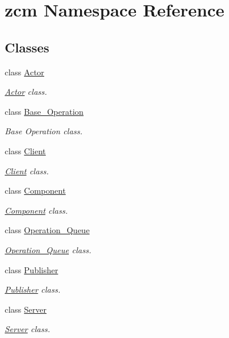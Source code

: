 \hypertarget{namespacezcm}{}\section{zcm Namespace Reference}
\label{namespacezcm}
\subsection*{Classes}
\begin{DoxyCompactItemize}
\item 
class \hyperlink{classzcm_1_1Actor}{Actor}
\begin{DoxyCompactList}\small\item\em \hyperlink{classzcm_1_1Actor}{Actor} class. \end{DoxyCompactList}\item 
class \hyperlink{classzcm_1_1Base__Operation}{Base\+\_\+\+Operation}
\begin{DoxyCompactList}\small\item\em Base Operation class. \end{DoxyCompactList}\item 
class \hyperlink{classzcm_1_1Client}{Client}
\begin{DoxyCompactList}\small\item\em \hyperlink{classzcm_1_1Client}{Client} class. \end{DoxyCompactList}\item 
class \hyperlink{classzcm_1_1Component}{Component}
\begin{DoxyCompactList}\small\item\em \hyperlink{classzcm_1_1Component}{Component} class. \end{DoxyCompactList}\item 
class \hyperlink{classzcm_1_1Operation__Queue}{Operation\+\_\+\+Queue}
\begin{DoxyCompactList}\small\item\em \hyperlink{classzcm_1_1Operation__Queue}{Operation\+\_\+\+Queue} class. \end{DoxyCompactList}\item 
class \hyperlink{classzcm_1_1Publisher}{Publisher}
\begin{DoxyCompactList}\small\item\em \hyperlink{classzcm_1_1Publisher}{Publisher} class. \end{DoxyCompactList}\item 
class \hyperlink{classzcm_1_1Server}{Server}
\begin{DoxyCompactList}\small\item\em \hyperlink{classzcm_1_1Server}{Server} class. \end{DoxyCompactList}\item 

\end{DoxyCompactItemize}
